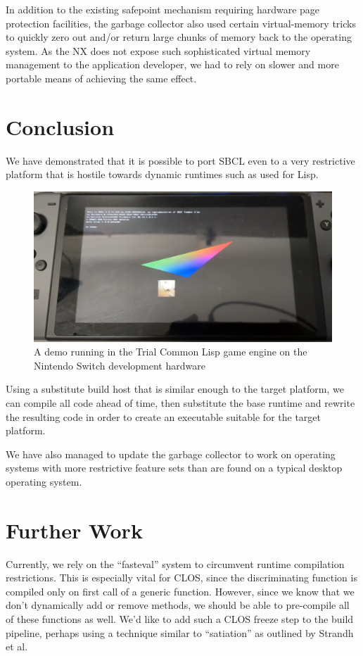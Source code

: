 \documentclass[format=sigconf]{acmart}
\begin{document}
In addition to the existing safepoint mechanism requiring hardware page protection facilities, the garbage collector also used certain virtual-memory tricks to quickly zero out and/or return large chunks of memory back to the operating system. As the NX does not expose such sophisticated virtual memory management to the application developer, we had to rely on slower and more portable means of achieving the same effect.

\section{Conclusion}\label{conclusion}
We have demonstrated that it is possible to port SBCL even to a very restrictive platform that is hostile towards dynamic runtimes such as used for Lisp.

\begin{figure}[h]
  \centering
  \includegraphics[width=\linewidth]{photo.png}
  \caption{A demo running in the Trial Common Lisp game engine on the Nintendo Switch development hardware}
\end{figure}

Using a substitute build host that is similar enough to the target platform, we can compile all code ahead of time, then substitute the base runtime and rewrite the resulting code in order to create an executable suitable for the target platform.

We have also managed to update the garbage collector to work on operating systems with more restrictive feature sets than are found on a typical desktop operating system.

\section{Further Work}\label{further-work}
Currently, we rely on the ``fasteval'' system to circumvent runtime compilation restrictions. This is especially vital for CLOS, since the discriminating function is compiled only on first call of a generic function. However, since we know that we don't dynamically add or remove methods, we should be able to pre-compile all of these functions as well. We'd like to add such a CLOS freeze step to the build pipeline, perhaps using a technique similar to ``satiation'' as outlined by Strandh et al.\cite{strandh2014resolving}
\end{document}
